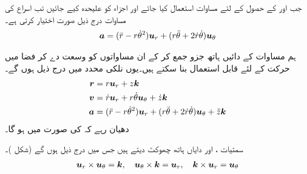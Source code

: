 جب  اور  کے حصول کے لئے   مساوات  استعمال کیا جائے اور اجزاء کو علیحدہ کیے جائیں  تب اسراع کی مساوات   درج ذیل  صورت اختیار کرتی ہے۔
\begin{align}\label{مساوات_سمتی_تفاعل_قطبی_روپ_ث}
{\ensuremath{{\boldsymbol{a}}}}=(\ddot{r}-r\dot{\theta}^2){{\boldsymbol{u}}}_r+(r\ddot{\theta}+2\dot{r}\dot{\theta}){{\boldsymbol{u}}}_{\theta}
\end{align} 

 ہم مساوات  کے دائیں ہاتھ جزو    جمع کر کے ان مساواتوں کو وسعت دے کر  فضا میں حرکت کے لئے  قابل استعمال بنا سکتے ہیں۔یوں نلکی محدد میں درج ذیل ہوں گے۔
\begin{gather}
\begin{aligned}
{\ensuremath{{\boldsymbol{r}}}}&=r{{\boldsymbol{u}}}_r+z{\boldsymbol{k}}\\
{{\boldsymbol{v}}}&=\dot{r}{{\boldsymbol{u}}}_r+r\dot{\theta}{{\boldsymbol{u}}}_{\theta}+\dot{z}{\boldsymbol{k}}\\
{{\boldsymbol{a}}}&=(\ddot{r}-r\dot{\theta}^2){{\boldsymbol{u}}}_r+(r\ddot{\theta}+2\dot{r}\dot{\theta}){{\boldsymbol{u}}}_{\theta}+\ddot{z}{\boldsymbol{k}}
\end{aligned}
\end{gather}
دھیان رہے کہ  کی صورت میں  ہو گا۔

سمتیات ،  اور  دایاں ہاتھ چھوکٹ دیتے ہیں جس میں درج ذیل ہوں گے (شکل )۔
\begin{align}
{\ensuremath{{\boldsymbol{u}}}}_r\times{\ensuremath{{\boldsymbol{u}}}}_{\theta}={\boldsymbol{k}},\quad {\ensuremath{{\boldsymbol{u}}}}_{\theta}\times{\boldsymbol{k}}={{\boldsymbol{u}}}_r,\quad {\boldsymbol{k}}\times{\ensuremath{{\boldsymbol{u}}}}_r={{\boldsymbol{u}}}_{\theta}
\end{align}

